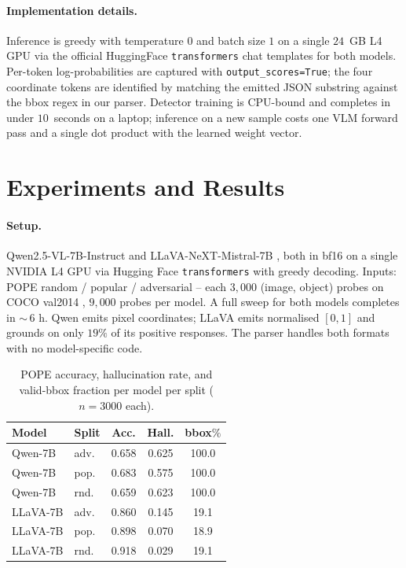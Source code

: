 \documentclass[10pt,twocolumn,letterpaper]{article}
\begin{document}
\paragraph{Implementation details.} Inference is greedy with
temperature $0$ and batch size $1$ on a single $24$~GB L4 GPU via
the official HuggingFace \texttt{transformers} chat templates for
both models. Per-token log-probabilities are captured with
\texttt{output\_scores=True}; the four coordinate tokens are
identified by matching the emitted JSON substring against the bbox
regex in our parser. Detector training is CPU-bound and completes
in under $10$~seconds on a laptop; inference on a new sample costs
one VLM forward pass and a single dot product with the learned
weight vector.

\section{Experiments and Results} \label{sec:exp}

\paragraph{Setup.} Qwen2.5-VL-7B-Instruct \cite{qwen25vl} and
LLaVA-NeXT-Mistral-7B \cite{llavanext}, both in bf16 on a single
NVIDIA L4 GPU via Hugging Face \texttt{transformers} with greedy
decoding. Inputs: POPE random / popular / adversarial -- each
$3{,}000$ (image, object) probes on COCO val2014 \cite{mscoco},
$9{,}000$ probes per model. A full sweep for both models completes in
$\sim$\,6 h. Qwen emits pixel coordinates; LLaVA emits normalised
$[0,1]$ and grounds on only $19\%$ of its positive responses. The
parser handles both formats with no model-specific code.

\begin{table}[!htbp]
\centering\small
\setlength{\tabcolsep}{3pt}
\begin{tabular}{llccc}
\toprule
\textbf{Model} & \textbf{Split} & Acc. & Hall. & bbox$\%$ \\
\midrule
Qwen-7B   & adv. & 0.658 & 0.625 & 100.0 \\
Qwen-7B   & pop. & 0.683 & 0.575 & 100.0 \\
Qwen-7B   & rnd. & 0.659 & 0.623 & 100.0 \\
\addlinespace
LLaVA-7B  & adv. & 0.860 & 0.145 & 19.1 \\
LLaVA-7B  & pop. & 0.898 & 0.070 & 18.9 \\
LLaVA-7B  & rnd. & 0.918 & 0.029 & 19.1 \\
\bottomrule
\end{tabular}
\caption{POPE accuracy, hallucination rate, and valid-bbox
fraction per model per split ($n{=}3000$ each).}
\label{tab:rates}
\end{table}
\end{document}
